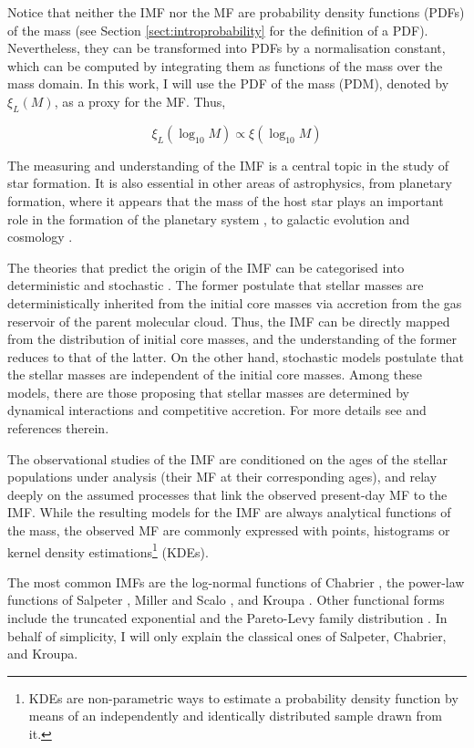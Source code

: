 Notice that neither the IMF nor the MF are probability density functions (PDFs) of the mass (see Section \ref{sect:introprobability} for the definition of a PDF). Nevertheless, they can be transformed into PDFs by a normalisation constant, which can be computed by integrating them as functions of the mass over the mass domain. In this work, I will use the PDF of the mass (PDM), denoted by $\xi_L (M)$, as a proxy for the MF. Thus,

\begin{equation}
\xi_L (\log_{10} M) \propto \xi (\log_{10} M)
\end{equation}

The measuring and understanding of the IMF is a central topic in the study of star formation. It is also essential in other areas of astrophysics, from planetary formation, where it appears that the mass of the host star plays an important role in the formation of the planetary system \cite[see for example][]{2015ApJ...814..130M}, to galactic evolution \citep{1998ASPC..142....1K} and cosmology \cite[see for example][]{2012MNRAS.423.3601N}. 

The theories that predict the origin of the IMF can be categorised into deterministic and stochastic \citep{Offner2014}. The former postulate that stellar masses are deterministically inherited from the initial core masses via accretion from the gas reservoir of the parent molecular cloud. Thus, the IMF can be directly mapped from the distribution of initial core masses, and the understanding of the former reduces to that of the latter. On the other hand, stochastic models postulate that the stellar masses are independent of the initial core masses. Among these models, there are those proposing that stellar masses are determined by dynamical interactions and competitive accretion. For more details see \citet{Offner2014} and references therein. 

  The observational studies of the IMF are conditioned on the ages of the stellar populations under analysis (their MF at their corresponding ages), and relay deeply on the assumed processes that link the observed present-day MF to the IMF. While the resulting models for the IMF are always analytical functions of the mass, the observed MF are commonly expressed with points, histograms or kernel density estimations\footnote{KDEs are non-parametric ways to estimate a probability density function by means of an independently and identically distributed sample drawn from it.} (KDEs).

The most common IMFs are the log-normal functions of Chabrier \citep{Chabrier2003a,Chabrier2003b,Chabrier2005}, the power-law functions of Salpeter \citep{Salpeter1955}, Miller and Scalo \citep{1979ApJS...41..513M}, and Kroupa \citep{2001MNRAS.322..231K,2002Sci...295...82K,2013pss5.book..115K,Thies2007,2008MNRAS.390.1200T}. Other functional forms include the truncated exponential \citep{2001AGM....18S0551D} and the Pareto-Levy family distribution \citep{2012MNRAS.423.1018C}. In behalf of simplicity, I will only explain the classical ones of Salpeter, Chabrier, and Kroupa.

